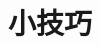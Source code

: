 \documentclass[../main.tex]{subfiles} %
\begin{document}
\chapter{小技巧}





% 

% 

% 

% 

% 

% 

% 

% 
\end{document}
